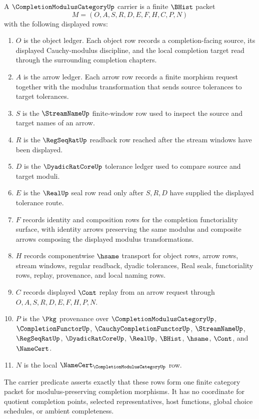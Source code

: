 \begin{definition}
\label{def:completion-modulus-category-carrier}
A $\CompletionModulusCategoryUp$ carrier is a finite $\BHist$ packet
$$
M=(O,A,S,R,D,E,F,H,C,P,N)
$$
with the following displayed rows:
\begin{enumerate}
\item $O$ is the object ledger. Each object row records a completion-facing source, its displayed Cauchy-modulus discipline, and the local completion target read through the surrounding completion chapters.
\item $A$ is the arrow ledger. Each arrow row records a finite morphism request together with the modulus transformation that sends source tolerances to target tolerances.
\item $S$ is the $\StreamNameUp$ finite-window row used to inspect the source and target names of an arrow.
\item $R$ is the $\RegSeqRatUp$ readback row reached after the stream windows have been displayed.
\item $D$ is the $\DyadicRatCoreUp$ tolerance ledger used to compare source and target moduli.
\item $E$ is the $\RealUp$ seal row read only after $S,R,D$ have supplied the displayed tolerance route.
\item $F$ records identity and composition rows for the completion functoriality surface, with identity arrows preserving the same modulus and composite arrows composing the displayed modulus transformations.
\item $H$ records componentwise $\hsame$ transport for object rows, arrow rows, stream windows, regular readback, dyadic tolerances, Real seals, functoriality rows, replay, provenance, and local naming rows.
\item $C$ records displayed $\Cont$ replay from an arrow request through $O,A,S,R,D,E,F,H,P,N$.
\item $P$ is the $\Pkg$ provenance over $\CompletionModulusCategoryUp$, $\CompletionFunctorUp$, $\CauchyCompletionFunctorUp$, $\StreamNameUp$, $\RegSeqRatUp$, $\DyadicRatCoreUp$, $\RealUp$, $\BHist$, $\hsame$, $\Cont$, and $\NameCert$.
\item $N$ is the local $\NameCert_{\CompletionModulusCategoryUp}$ row.
\end{enumerate}
The carrier predicate asserts exactly that these rows form one finite category packet for modulus-preserving completion morphisms. It has no coordinate for quotient completion points, selected representatives, host functions, global choice schedules, or ambient completeness.
\end{definition}

